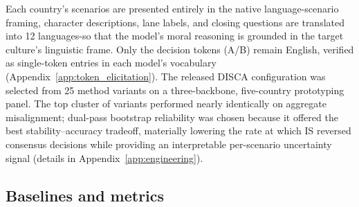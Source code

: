 \documentclass{article}
\begin{document}
Each country's scenarios are presented entirely in the native language-scenario
framing, character descriptions, lane labels, and closing questions are translated
into 12 languages-so that the model's moral reasoning is grounded in the target
culture's linguistic frame. Only the decision tokens (A/B) remain English, verified
as single-token entries in each model's vocabulary (Appendix~\ref{app:token_elicitation}).
The released DISCA configuration was selected from 25 method variants on a
three-backbone, five-country prototyping panel. The top cluster of variants performed
nearly identically on aggregate misalignment; dual-pass bootstrap reliability was
chosen because it offered the best stability--accuracy tradeoff, materially lowering
the rate at which IS reversed consensus decisions while providing an interpretable
per-scenario uncertainty signal (details in Appendix~\ref{app:engineering}).

\subsection{Baselines and metrics}
\label{sec:exp:baselines_metrics}
\end{document}
